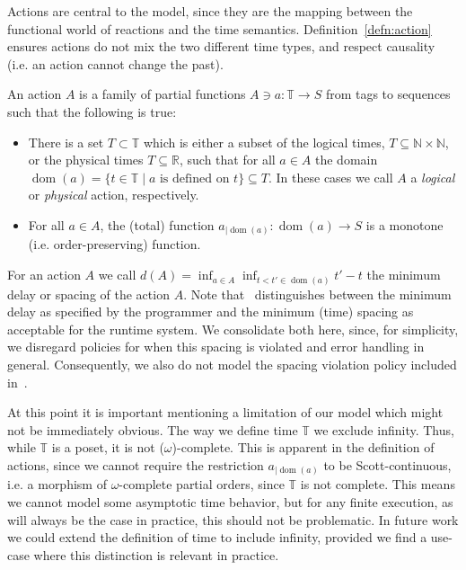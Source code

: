 Actions are central to the model, since they are the mapping between the functional world of reactions and the time semantics. 
Definition~\ref{defn:action} ensures actions do not mix the two different time types, and respect causality (i.e. an action cannot change the past).

\begin{defn}
    \label{defn:action}
An action $A$ is a family of partial functions $A \ni a : \mathbb{T} \rightarrow S$ from tags to sequences such that the following is true:
\begin{itemize}
    \item There is a set $T \subset \mathbb{T}$ which is either a subset of the logical times, $T \subseteq \mathbb{N} \times \mathbb{N}$, or the physical times $T \subseteq \mathbb{R}$, such that for all $a \in A$ the domain $\operatorname{dom}(a) = \{ t \in \mathbb{T} \mid a \text{ is defined on } t \} \subseteq T$.
    In these cases we call $A$ a \emph{logical} or \emph{physical} action, respectively.
    \item For all $a \in A$, the (total) function $a_{\big| \operatorname{dom}(a)}:\operatorname{dom}(a) \rightarrow S$ is a monotone (i.e. order-preserving) function.
\end{itemize}
\end{defn}

For an action $A$ we call $d(A) = \operatorname{inf}_{a \in A} \operatorname{inf}_{t < t' \in \operatorname{dom}(a)} t' - t$ the minimum delay or spacing of the action $A$.
Note that~\cite{lohstroh_phdthesis} distinguishes between the minimum delay as specified by the programmer and the minimum (time) spacing as acceptable for the runtime system.
We consolidate both here, since, for simplicity, we disregard policies for when this spacing is violated and error handling in general.
Consequently, we also do not model the spacing violation policy included in~\cite{lohsroh_phdthesis}. 

At this point it is important mentioning a limitation of our model which might not be immediately obvious.
The way we define time $\mathbb{T}$ we exclude infinity. Thus, while $\mathbb{T}$ is a \ac{poset}, it is not ($\omega$)-complete.
This is apparent in the definition of actions, since we cannot require the restriction $a_{\big| \operatorname{dom}(a)}$ to be Scott-continuous, i.e. a morphism of $\omega$-complete partial orders, since $\mathbb{T}$ is not complete. 
This means we cannot model some asymptotic time behavior, but for any finite execution, as will always be the case in practice, this should not be problematic.
In future work we could extend the definition of time to include infinity, provided we find a use-case where this distinction is relevant in practice.

